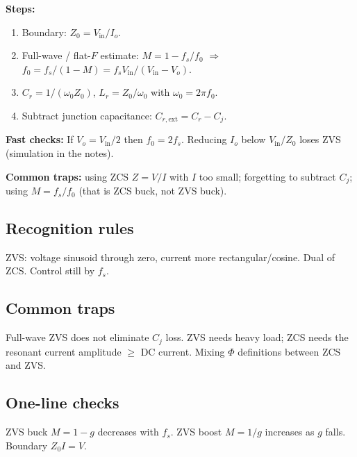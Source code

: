 \textbf{Steps:}
\begin{enumerate}
  \item Boundary: \(Z_0=V_{\mathrm{in}}/I_o\).
  \item Full-wave / flat-\(F\) estimate: \(M=1-f_s/f_0\) \(\Rightarrow\) \(f_0=f_s/(1-M)=f_s V_{\mathrm{in}}/(V_{\mathrm{in}}-V_o)\).
  \item \(C_r=1/(\omega_0 Z_0)\), \(L_r=Z_0/\omega_0\) with \(\omega_0=2\pi f_0\).
  \item Subtract junction capacitance: \(C_{r,\mathrm{ext}}=C_r-C_j\).
\end{enumerate}

\textbf{Fast checks:} If \(V_o=V_{\mathrm{in}}/2\) then \(f_0=2f_s\). Reducing \(I_o\) below \(V_{\mathrm{in}}/Z_0\) loses ZVS (simulation in the notes).

\textbf{Common traps:} using ZCS \(Z=V/I\) with \(I\) too small; forgetting to subtract \(C_j\); using \(M=f_s/f_0\) (that is ZCS buck, not ZVS buck).

\subsection{Recognition rules}
ZVS: voltage sinusoid through zero, current more rectangular/cosine. Dual of ZCS. Control still by \(f_s\).

\subsection{Common traps}
Full-wave ZVS does not eliminate \(C_j\) loss. ZVS needs heavy load; ZCS needs the resonant current amplitude \(\ge\) DC current. Mixing \(\Phi\) definitions between ZCS and ZVS.

\subsection{One-line checks}
ZVS buck \(M=1-g\) decreases with \(f_s\). ZVS boost \(M=1/g\) increases as \(g\) falls. Boundary \(Z_0 I = V\).
